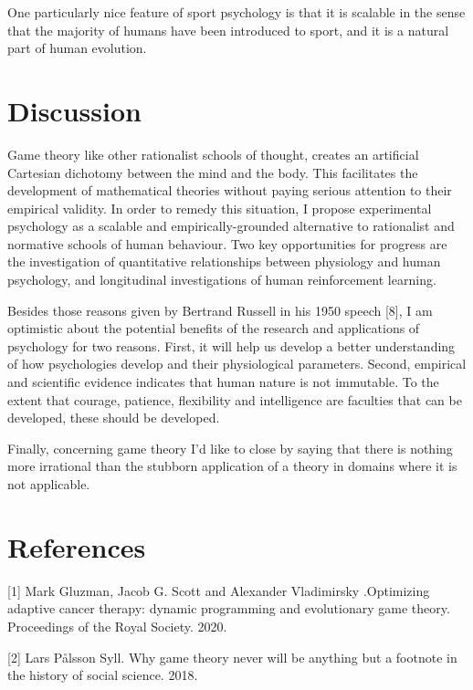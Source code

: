 \documentclass{article}
\begin{document}
One particularly nice feature of sport psychology is that it is scalable in the sense that the majority of humans have been introduced to sport, and it is 
a natural part of human evolution. 

\newpage

\section{Discussion}

Game theory like other rationalist schools of thought, creates an artificial Cartesian dichotomy between the mind and the body. This facilitates the development of mathematical theories without paying serious attention to their empirical validity. In order to remedy this situation, I propose 
experimental psychology as a scalable and empirically-grounded alternative 
to rationalist and normative schools of human behaviour. Two key opportunities
for progress are the investigation of quantitative relationships between physiology and human psychology, and longitudinal investigations of human reinforcement learning. 

Besides those reasons given by Bertrand Russell in his 1950 speech [8], I am optimistic about the potential benefits of the research and applications of 
psychology for two reasons. First, it will help us develop a better understanding
of how psychologies develop and their physiological parameters. Second, empirical and scientific evidence indicates that human nature is not immutable. To the extent that courage, patience, flexibility and intelligence are faculties that can be developed, these should be developed. 

Finally, concerning game theory I'd like to close by saying that there is nothing more irrational than the stubborn application of a theory in domains where it is not applicable.  

\section*{References}

\small

[1] Mark Gluzman, Jacob G. Scott and Alexander Vladimirsky .Optimizing adaptive cancer therapy: dynamic programming and evolutionary game theory. Proceedings of the Royal Society. 2020.

[2] Lars Pålsson Syll. Why game theory never will be anything but a footnote in the history of social science. 2018.
\end{document}
